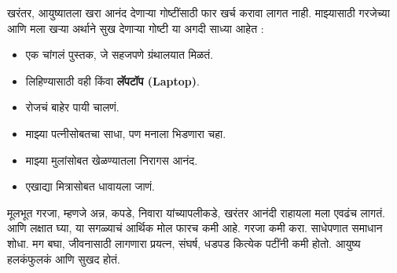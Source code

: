 खरंतर, आयुष्यातला खरा आनंद देणाऱ्या गोष्टींसाठी फार खर्च करावा लागत नाही. माझ्यासाठी गरजेच्या आणि मला खऱ्या अर्थाने सुख देणाऱ्या गोष्टी या अगदी साध्या आहेत :
\begin{itemize}
 \item एक चांगलं पुस्तक, जे सहजपणे ग्रंथालयात मिळतं.
 \item लिहिण्यासाठी वही किंवा \textbf{लॅपटॉप (Laptop)}.
 \item रोजचं बाहेर पायी चालणं.
 \item माझ्या पत्नीसोबतचा साधा, पण मनाला भिडणारा चहा.
 \item माझ्या मुलांसोबत खेळण्यातला निरागस आनंद.
 \item एखाद्या मित्रासोबत धावायला जाणं.
 \end{itemize}
मूलभूत गरजा, म्हणजे अन्न, कपडे, निवारा यांच्यापलीकडे, खरंतर आनंदी राहायला मला एवढंच लागतं. आणि लक्षात घ्या, या सगळ्याचं आर्थिक मोल फारच कमी आहे.
गरजा कमी करा. साधेपणात समाधान शोधा. मग बघा, जीवनासाठी लागणारा प्रयत्न, संघर्ष, धडपड कित्येक पटींनी कमी होतो. आयुष्य हलकंफुलकं आणि सुखद होतं.
